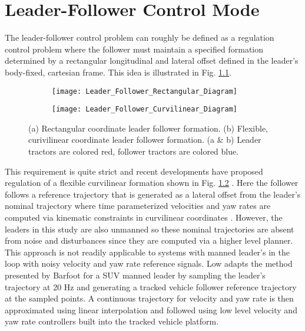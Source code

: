 \chapter{Leader-Follower Control Mode}
\label{ch:LFCM}
The leader-follower control problem can roughly be defined as a regulation control problem where the follower must maintain a specified formation determined by a rectangular longitudinal and lateral offset defined in the leader's body-fixed, cartesian frame. This idea is illustrated in Fig. \ref{fig:Leader_Follower_Rectangular_Diagram}.
\begin{figure}[b]
\begin{subfigure}{0.525\textwidth}
\texttt{[image: Leader\_Follower\_Rectangular\_Diagram]}
\caption{}
\label{fig:Leader_Follower_Rectangular_Diagram}
\end{subfigure}
\begin{subfigure}{0.525\textwidth}
\texttt{[image: Leader\_Follower\_Curvilinear\_Diagram]}
\caption{}
\label{fig:Leader_Follower_Curvilinear_Diagram}
\end{subfigure}
\caption{(a) Rectangular coordinate leader follower formation.  (b) Flexible, curivilinear coordinate leader follower formation.  (a \& b) Leader tractors are colored red, follower tractors are colored blue.}
\label{fig:Leader_Follower_Concept}
\end{figure}
This requirement is quite strict and recent developments have proposed regulation of a flexible curvilinear formation shown in Fig. \ref{fig:Leader_Follower_Curvilinear_Diagram} \cite{barfoot2004motion}. Here the follower follows a reference trajectory that is generated as a lateral offset from the leader's nominal trajectory where time parameterized velocities and yaw rates are computed via kinematic constraints in curvilinear coordinates \cite{barfoot2004motion}. However, the leaders in this study are also unmanned so these nominal trajectories are absent from noise and disturbances since they are computed via a higher level planner. This approach is not readily applicable to systems with manned leader's in the loop with noisy velocity and yaw rate reference signals. Low \cite{low2015flexible, low2014flexible} adapts the method presented by Barfoot \cite{barfoot2004motion} for a SUV manned leader by sampling the leader's trajectory at 20 Hz and generating a tracked vehicle follower reference trajectory at the sampled points. A continuous trajectory for velocity and yaw rate is then approximated using linear interpolation and followed using low level velocity and yaw rate controllers built into the tracked vehicle platform.

